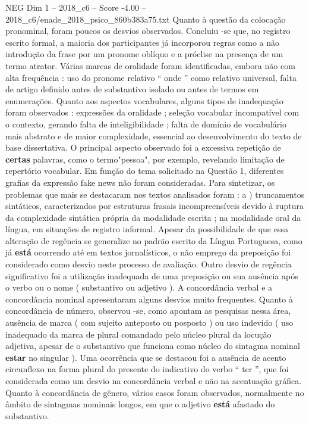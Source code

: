\begin{textsample}{NEG Dim 1 – 2018\_c6 – Score -4.00 – 2018\_c6/enade\_2018\_psico\_860b383a75.txt}
Quanto à questão da colocação pronominal, foram poucos os desvios observados.
Concluiu -se que, no registro escrito formal, a maioria dos participantes já incorporou regras como a não introdução da frase por um pronome oblíquo e a próclise na presença de um termo atrator.
Várias marcas de oralidade foram identificadas, embora não com alta frequência : uso do pronome relativo “ onde ” como relativo universal, falta de artigo definido antes de substantivo isolado ou antes de termos em enumerações.
Quanto aos aspectos vocabulares, alguns tipos de inadequação foram observados : expressões da oralidade ; seleção vocabular incompatível com o contexto, gerando falta de inteligibilidade ; falta de domínio de vocabulário mais abstrato e de maior complexidade, essencial ao desenvolvimento do texto de base dissertativa.
O principal aspecto observado foi a excessiva repetição de \textbf{certas} palavras, como o termo"pessoa", por exemplo, revelando limitação de repertório vocabular.
Em função do tema solicitado na Questão 1, diferentes grafias da expressão fake news não foram consideradas.
Para sintetizar, os problemas que mais se destacaram nos textos analisados foram : a ) truncamentos sintáticos, caracterizados por estruturas frasais incompreensíveis devido à ruptura da complexidade sintática própria da modalidade escrita ; na modalidade oral da língua, em situações de registro informal.
Apesar da possibilidade de que essa alteração de regência se generalize no padrão escrito da Língua Portuguesa, como já \textbf{está} ocorrendo até em textos jornalísticos, o não emprego da preposição foi considerado como desvio neste processo de avaliação.
Outro desvio de regência significativo foi a utilização inadequada de uma preposição ou sua ausência após o verbo ou o nome ( substantivo ou adjetivo ).
A concordância verbal e a concordância nominal apresentaram alguns desvios muito frequentes.
Quanto à concordância de número, observou -se, como apontam as pesquisas nessa área, ausência de marca ( com sujeito anteposto ou posposto ) ou uso indevido ( uso inadequado da marca de plural comandado pelo núcleo plural da locução adjetiva, apesar de o substantivo que funciona como núcleo do sintagma nominal \textbf{estar} no singular ).
Uma ocorrência que se destacou foi a ausência de acento circunflexo na forma plural do presente do indicativo do verbo “ ter ”, que foi considerada como um desvio na concordância verbal e não na acentuação gráfica.
Quanto à concordância de gênero, vários casos foram observados, normalmente no âmbito de sintagmas nominais longos, em que o adjetivo \textbf{está} afastado do substantivo.

\end{textsample}

